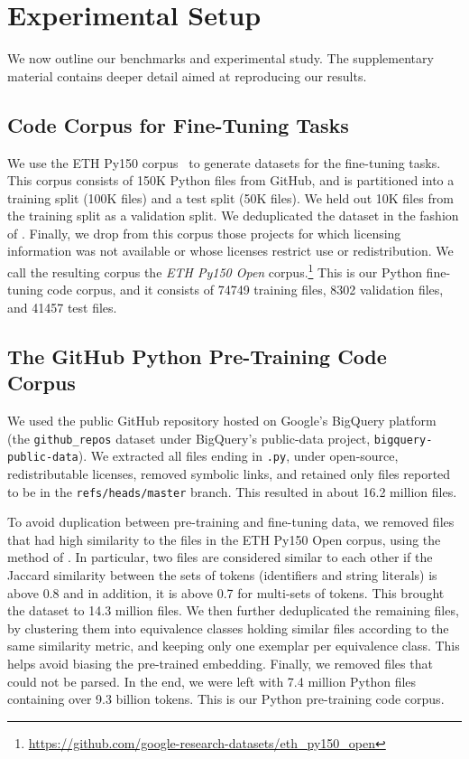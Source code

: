 \documentclass{article}
\newcommand{\update}[1]{#1}
\begin{document}
\section{Experimental Setup}

We now outline our benchmarks and experimental study. The supplementary material contains deeper detail aimed at reproducing our results.

\subsection{Code Corpus for Fine-Tuning Tasks}
\label{sec:py150}

We use the ETH Py150 corpus~\citep{ethpy150} to generate datasets for the fine-tuning tasks. This corpus consists of \update{150K} Python files from GitHub, and is partitioned into a training split (\update{100K} files) and a test split (\update{50K} files). We held out \update{10K} files from the training split as a validation split.
We deduplicated the dataset in the fashion of \citet{DBLP:journals/corr/abs-1812-06469}.
Finally, we drop from this corpus those projects for which licensing information was not available or whose licenses restrict use or redistribution. We call the resulting corpus the \emph{ETH Py150 Open} corpus.\footnote{\url{https://github.com/google-research-datasets/eth_py150_open}}
This is our Python fine-tuning code corpus, and it consists of \num{74749} training files, \num{8302} validation files, and \num{41457} test files.

\subsection{The GitHub Python Pre-Training Code Corpus}
\label{sec:github}

We used the public GitHub repository hosted on Google's BigQuery platform (the \texttt{github\_repos} dataset under BigQuery's public-data project, \texttt{bigquery-public-data}). We extracted all files ending in \texttt{.py}, under open-source, redistributable licenses, removed symbolic links, and retained only files reported to be in the \texttt{refs/heads/master} branch. This resulted in about \update{\num{16.2} million} files.

To avoid duplication between pre-training and fine-tuning data, we removed files that had high similarity to the files in the ETH Py150 Open corpus, using the method of \citet{DBLP:journals/corr/abs-1812-06469}. In particular, two files are considered similar to each other if the Jaccard similarity between the sets of tokens (identifiers and string literals) is above 0.8 and in addition, it is above 0.7 for multi-sets of tokens. This brought the dataset to \update{\num{14.3} million} files. We then further deduplicated the remaining files, by clustering them into equivalence classes holding similar files according to the same similarity metric, and keeping only one exemplar per equivalence class. This helps avoid biasing the pre-trained embedding. Finally, we removed files that could not be parsed.
In the end, we were left with \update{\num{7.4}} million Python files containing over \update{\num{9.3} billion tokens}. This is our Python pre-training code corpus.
\end{document}
